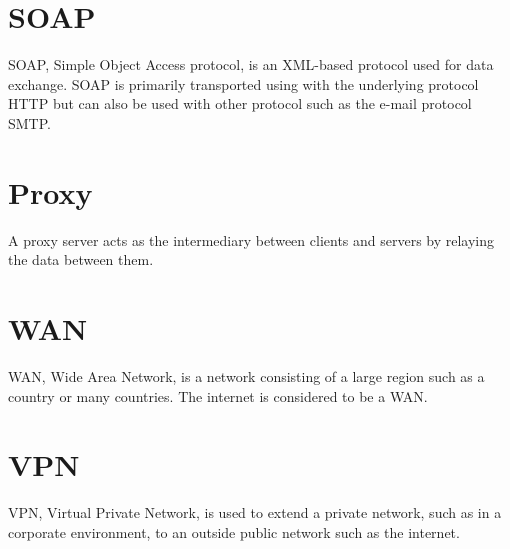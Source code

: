 \documentclass{cslthse-msc}
\begin{document}
\begin{appendices}
\section{SOAP}
SOAP, Simple Object Access protocol, is an XML-based protocol used for data exchange. SOAP is primarily transported using with the underlying protocol HTTP but can also be used with other protocol such as the e-mail protocol SMTP.

\section{Proxy}
A proxy server acts as the intermediary between clients and servers by relaying the data between them.

\section{WAN}
WAN, Wide Area Network, is a network consisting of a large region such as a country or many countries. The internet is considered to be a WAN.

\section{VPN}
VPN, Virtual Private Network, is used to extend a private network, such as in a corporate environment, to an outside public network such as the internet.

\end{appendices}

\end{document}
